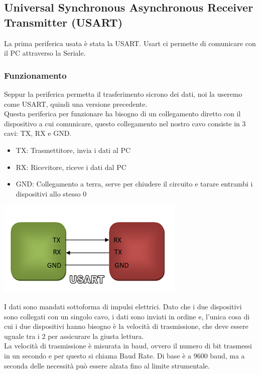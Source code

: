 \pagebreak
\subsection{Universal Synchronous Asynchronous Receiver Transmitter (USART)}
La prima periferica usata è stata la USART. Usart ci permette di comunicare con il PC attraverso la Seriale.
\\

\subsubsection{Funzionamento}
Seppur la periferica permetta il trasferimento sicrono dei dati, noi la useremo come USART, quindi una versione precedente.\\

Questa periferica per funzionare ha bisogno di un collegamento diretto con il dispositivo a cui comunicare, questo collegamento nel nostro cavo consiste in 3 cavi: TX, RX e GND.\\


\noindent
\begin{minipage}[c]{0.54\linewidth}
    \begin{itemize}
        \item TX: Trasmettitore, invia i dati al PC
        \item RX: Ricevitore, riceve i dati dal PC
        \item GND: Collegamento a terra, serve per chiudere il circuito e tarare entrambi i dispositivi allo stesso 0
    \end{itemize}
\end{minipage}
\hfill
\begin{minipage}[t]{0.4\linewidth}

    \centering
    \includegraphics[width=0.7\linewidth]{microcontrollore/assets/USART.png}
    \label{fig:USART}
\end{minipage}

I dati sono mandati sottoforma di impulsi elettrici. Dato che i due dispositivi sono collegati con un singolo cavo, i dati sono inviati in ordine e, l'unica cosa di cui i due dispositivi hanno bisogno è la velocità di trasmissione, che deve essere uguale tra i 2 per assicurare la giusta lettura.\\
La velocità di trasmissione è misurata in baud, ovvero il numero di bit trasmessi in un secondo e per questo si chiama Baud Rate. Di base è a 9600 baud, ma a seconda delle necessità può essere alzata fino al limite strumentale.\\

